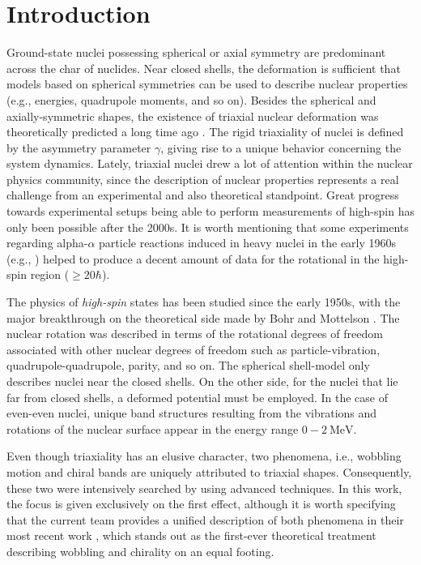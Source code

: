 \chapter{Introduction}

Ground-state nuclei possessing spherical or axial symmetry are predominant across the char of nuclides. Near closed shells, the deformation is sufficient that models based on spherical symmetries can be used to describe nuclear properties (e.g., energies, quadrupole moments, and so on). Besides the spherical and axially-symmetric shapes, the existence of triaxial nuclear deformation was theoretically predicted a long time ago \cite{bohr1998nuclear}. The rigid triaxiality of nuclei is defined by the asymmetry parameter $\gamma$, giving rise to a unique behavior concerning the system dynamics. Lately, triaxial nuclei drew a lot of attention within the nuclear physics community, since the description of nuclear properties represents a real challenge from an experimental and also theoretical standpoint. Great progress towards experimental setups being able to perform measurements of high-spin has only been possible after the 2000s. It is worth mentioning that some experiments regarding alpha-$\alpha$ particle reactions induced in heavy nuclei in the early 1960s (e.g., \cite{morinaga1963gamma}) helped to produce a decent amount of data for the rotational in the high-spin region ($\geq 20 \hbar$).

The physics of \emph{high-spin} states has been studied since the early 1950s, with the major breakthrough on the theoretical side made by Bohr and Mottelson \cite{bohr1998nuclear}. The nuclear rotation was described in terms of the rotational degrees of freedom associated with other nuclear degrees of freedom such as particle-vibration, quadrupole-quadrupole, parity, and so on. The spherical shell-model only describes nuclei near the closed shells. On the other side, for the nuclei that lie far from closed shells, a deformed potential must be employed. In the case of even-even nuclei, unique band structures resulting from the vibrations and rotations of the nuclear surface appear in the energy range $0-2\ \text{MeV}$.

Even though triaxiality has an elusive character, two phenomena, i.e., wobbling motion and chiral bands are uniquely attributed to triaxial shapes. Consequently, these two were intensively searched by using advanced techniques. In this work, the focus is given exclusively on the first effect, although it is worth specifying that the current team provides a unified description of both phenomena in their most recent work \cite{raduta2022simultaneous}, which stands out as the first-ever theoretical treatment describing wobbling and chirality on an equal footing.

